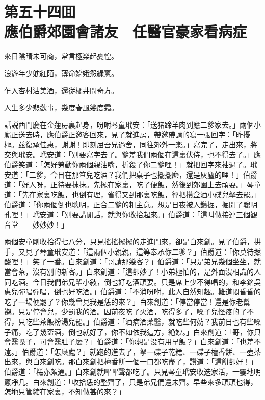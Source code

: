 
\chapter*{第五十四囬　\\應伯爵郊園會諸友　任醫官豪家看病症}


\begin{myquote}
來日陰晴未可商，常言極楽起憂惶。

浪遊年少躭紅陌，薄命嬌娥怨綠窻。

乍入杏村沽美酒，還従橘井問奇方。

人生多少悲歡事，幾度春風幾度霜。
\end{myquote}

話説西門慶在金蓮房裏起身，吩咐琴童玳安：「送猪蹄羊肉到應二爹家去。」兩個小廝正送去時，應伯爵正邀客回來，見了就進房，帶邀帶請的寫一張回字：「昨擾極。兹復承佳惠，謝謝！即刻屈吾兄過舍，同往郊外一楽。」寫完了，走出來，將交與玳安。玳安道：「别要寫字去了。爹差我們兩個在這裏伏侍，也不得去了。」應伯爵笑道：「怎好勞動你兩個親油嘴，折殺了你二爹哩！」就把回字來袖過了。玳安道：「二爹，今日在那笪兒吃酒？我們把桌子也擺擺麽，還是灰塵的哩！」伯爵道：「好人呀，正待要抹抹。先擺在家裏，吃了便飯，然後到郊園上去頑耍。」琴童道：「先在家裏吃飯，也倒有理，省得又到那裏吃飯，徑把攢盒酒小碟兒拏去罷。」伯爵道：「你兩個倒也聰明，正合二爹的粗主意。想是日夜被人鑽掘，掘開了聰明孔哩！」玳安道：「別要講閒話，就與你收拾起來。」伯爵道：「這叫做接連三個觀音堂——妙妙妙！」

兩個安童剛收拾得七八分，只見搖搖擺擺的走進門來，卻是白來創。見了伯爵，拱手，又見了琴童玳安道：「這兩個小親親，這等奉承你二爹？」伯爵道：「你莫待撚酸哩！」笑了一番。白來創道：「哥請那幾客？」伯爵道：「只是弟兄幾個坐坐，就當會茶，沒有別的新客。」白來創道：「這卻妙了！小弟極怕的，是外面沒相識的人同吃酒。今日我們弟兄輩小敍，倒也好吃酒頑耍。只是席上少不得唱的，和李銘吳惠兒彈唱彈唱，倒也好吃酒。」伯爵道：「不消吩咐，此人自然知趣。難道悶昏昏的吃了一場便罷了？你幾曾見我是恁的來？」白來創道：「停當停當！還是你老幫襯。只是停會兒，少罰我的酒。因前夜吃了火酒，吃得多了，嗓子兒怪疼的了不得，只吃些茶飯粉湯兒罷。」伯爵道：「酒病酒薬醫，就吃些何妨？我前日也有些嗓子痛，吃了幾盃酒，倒也就好了，你不如依我這方，絶妙。」白來創道：「哥，你只會醫嗓子，可會醫肚子麽？」伯爵道：「你想是没有用早飯？」白來創道：「也差不遠。」伯爵道：「怎麽處？」就跑的進去了，拏一碟子乾糕、一碟子檀香餅、一壺茶出來，與白來創吃。那白來創把檀香餅一個一口都吃盡了，讚道：「這餅卻好！」伯爵道：「糕亦頗通。」白來創就嗶嗶聲都吃了。只見琴童玳安收迭家活，一霎地明窻凈几。白來創道：「收拾恁的整齊了，只是弟兄們還未齊。早些來多頑頑也得，怎地只管縮在家裏，不知做甚的來？」

